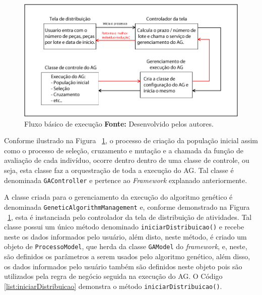 \begin{figure}[h!]
	\centerline{\includegraphics[scale=0.5]{./imagens/fluxo_basico.png}}
	\caption[Demonstração da execução de um AG]
	{Fluxo básico de execução \textbf{Fonte:} Desenvolvido pelos autores.}
	\label{fig:fluxo_basico}
\end{figure}

\par Conforme ilustrado na Figura ~\ref{fig:fluxo_basico}, o processo de criação da população inicial assim como o processo de seleção, 
cruzamento e mutação e a chamada da função de avaliação de cada indivíduo, ocorre dentro dentro de uma classe de controle,
ou seja, esta classe faz a orquestração de toda a execução do AG. Tal classe é denominada \texttt{GAController} e
pertence ao \textit{Framework} explanado anteriormente.

\par A classe criada para o gerenciamento da execução do algoritmo genético é denominada \texttt{GeneticAlgorithmManagement} e, conforme demonstrado na Figura ~\ref{fig:fluxo_basico}, esta é instanciada pelo controlador da tela de distribuição de atividades. Tal classe possui 
um único método denominado \texttt{iniciarDistribuicao()} e recebe neste os dados informados pelo usuário, além disto, neste
método, é criado um objeto de \texttt{ProcessoModel}, que herda da classe \texttt{GAModel} do \textit{framework}, e, neste, são 
definidos os parâmetros a serem usados pelo algoritmo genético, além disso, os dados informados pelo usuário também são definidos 
neste objeto pois são utilizados pela regra de negócio seguida na execução do AG. O Código \ref{list:iniciarDistribuicao} 
demonstra o método \texttt{iniciarDistribuicao()}.


